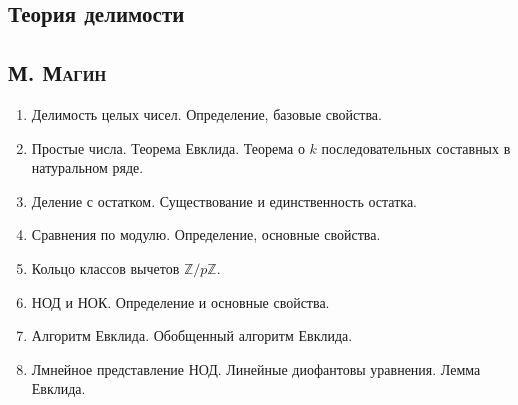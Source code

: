 \documentclass[12pt]{article}
\begin{document}
\begin{center}
    \section*{Теория делимости}
    \subsection*{\textsc{М. Магин}}
\end{center}

\begin{enumerate}
    \item Делимость целых чисел. Определение, базовые свойства.
    \item Простые числа. Теорема Евклида. Теорема о $k$ последовательных составных в натуральном ряде.
    \item Деление с остатком. Существование и единственность остатка.
    \item Сравнения по модулю. Определение, основные свойства.
    \item  Кольцо классов вычетов $\mathbb{Z}/p\mathbb{Z}$.
    \item НОД и НОК. Определение и основные свойства.
    \item Алгоритм Евклида. Обобщенный алгоритм Евклида.
    \item Лмнейное представление НОД. Линейные диофантовы уравнения. Лемма Евклида.
\end{enumerate}
\end{document}
